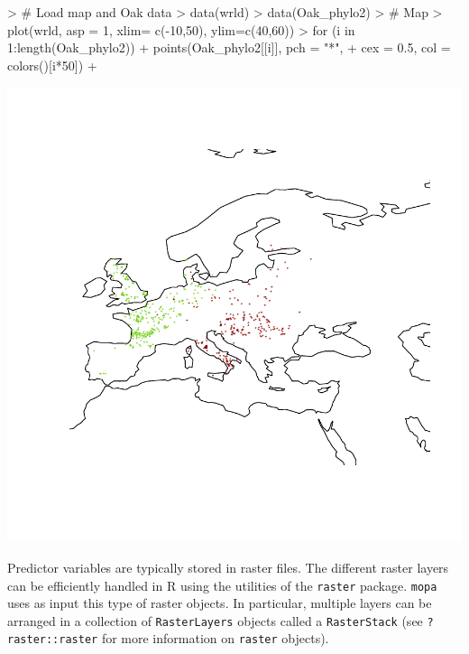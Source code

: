 \documentclass[10pt,a4paper]{article}
\begin{document}
\begin{Schunk}
\begin{Sinput}
> # Load map and Oak data
> data(wrld)
> data(Oak_phylo2)
> # Map 
> plot(wrld, asp = 1, xlim= c(-10,50), ylim=c(40,60))
> for (i in 1:length(Oak_phylo2)) {
+   points(Oak_phylo2[[i]], pch = "*", 
+          cex = 0.5, col = colors()[i*50])
+ }
\end{Sinput}
\end{Schunk}
\includegraphics{mopa-mopa2}

Predictor variables are typically stored in raster files. The different raster layers can be efficiently handled in R using the utilities of the \texttt{raster} package. \texttt{mopa} uses as input this type of raster objects. In particular, multiple layers can be arranged in a collection of \texttt{RasterLayers} objects called a \texttt{RasterStack} (see \texttt{?raster::raster} for more information on \texttt{raster} objects). 
\end{document}

